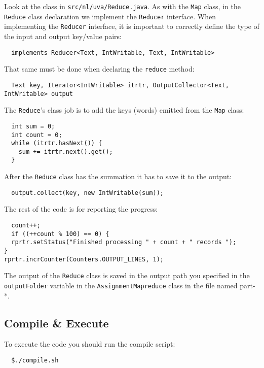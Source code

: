 \documentclass[a4paper,10pt]{article}
\begin{document}
Look at the class in \texttt{src/nl/uva/Reduce.java}. As with the \texttt{Map} class, in the \texttt{Reduce} class declaration we implement the \texttt{Reducer} interface. When implementing the \texttt{Reducer} interface, it is important to correctly define the type of the input and output key/value pairs:
\begin{lstlisting}
  implements Reducer<Text, IntWritable, Text, IntWritable> 
\end{lstlisting}

That same must be done when declaring the \texttt{reduce} method:
\begin{lstlisting}
  Text key, Iterator<IntWritable> itrtr, OutputCollector<Text, IntWritable> output
\end{lstlisting}


The \texttt{Reduce}'s class job is to add the keys (words) emitted from the \texttt{Map} class: 
\begin{lstlisting}
  int sum = 0;
  int count = 0;
  while (itrtr.hasNext()) {
    sum += itrtr.next().get();
  }
\end{lstlisting}


After the \texttt{Reduce} class has the summation it has to save it to the output: 

\begin{lstlisting}
  output.collect(key, new IntWritable(sum));
\end{lstlisting}


The rest of the code is for reporting the progress:

\begin{lstlisting}
  count++;
  if ((++count % 100) == 0) {
  rprtr.setStatus("Finished processing " + count + " records ");
}
rprtr.incrCounter(Counters.OUTPUT_LINES, 1);
\end{lstlisting}

The output of the \texttt{Reduce} class is saved in the output path you specified in the \texttt{outputFolder} variable in the \texttt{AssignmentMapreduce} class in the file named part-*. 

\subsection{Compile \& Execute}

To execute the code you should run the compile script:
\lstset{language=}
\begin{lstlisting}
  $./compile.sh 
\end{lstlisting}
\end{document}
